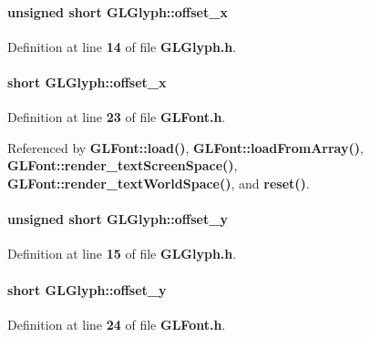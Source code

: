 \paragraph[{offset\+\_\+x}]{\setlength{\rightskip}{0pt plus 5cm}unsigned short G\+L\+Glyph\+::offset\+\_\+x}\label{structGLGlyph_a72830018d3d4f0fe55ec295c06c396e7}


Definition at line {\bf 14} of file {\bf G\+L\+Glyph.\+h}.

\paragraph[{offset\+\_\+x}]{\setlength{\rightskip}{0pt plus 5cm}short G\+L\+Glyph\+::offset\+\_\+x}\label{structGLGlyph_a8c3b2aba82134cd2a910387b9ebd78bc}


Definition at line {\bf 23} of file {\bf G\+L\+Font.\+h}.



Referenced by {\bf G\+L\+Font\+::load()}, {\bf G\+L\+Font\+::load\+From\+Array()}, {\bf G\+L\+Font\+::render\+\_\+text\+Screen\+Space()}, {\bf G\+L\+Font\+::render\+\_\+text\+World\+Space()}, and {\bf reset()}.

\paragraph[{offset\+\_\+y}]{\setlength{\rightskip}{0pt plus 5cm}unsigned short G\+L\+Glyph\+::offset\+\_\+y}\label{structGLGlyph_a7c22734c219dd2fd0d0836afd617d69f}


Definition at line {\bf 15} of file {\bf G\+L\+Glyph.\+h}.

\paragraph[{offset\+\_\+y}]{\setlength{\rightskip}{0pt plus 5cm}short G\+L\+Glyph\+::offset\+\_\+y}\label{structGLGlyph_aee3d3b2cb3435260c1b2d785dec9421f}


Definition at line {\bf 24} of file {\bf G\+L\+Font.\+h}.



